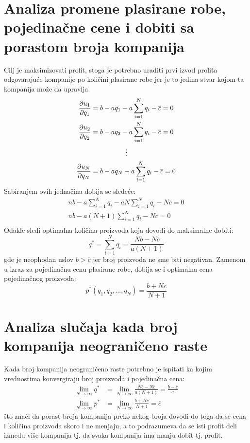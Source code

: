 \documentclass[12pt]{article}
\begin{document}
\section{Analiza promene plasirane robe, pojedinačne cene i dobiti sa porastom
broja kompanija}
\par Cilj je maksimizovati profit, stoga je potrebno uraditi prvi izvod profita
odgovarajuće kompanije po količini plasirane robe jer je to jedina stvar kojom
ta kompanija može da upravlja.
\begin{align*}
	\frac{\partial u_1}{\partial q_1} &= b - a q_1 - a \sum_{i=1}^N q_i
	- \overline{c} = 0\\ 
	\frac{\partial u_2}{\partial q_2} &= b - a q_2 - a \sum_{i=1}^N q_i
	- \overline{c} = 0\\ 
		&\hspace{1.8cm}\vdots \\
	\frac{\partial u_N}{\partial q_N} &= b - a q_N - a \sum_{i=1}^N q_i
	- \overline{c} = 0 \\ 
\end{align*}
Sabiranjem ovih jednačina dobija se sledeće:
\begin{gather*} 	
	n b - a \sum_{i=1}^N q_i - a N \sum_{i=1}^N q_i
	- N \overline{c} = 0 \\
	n b - a (N+1) \sum_{i=1}^N q_i - N \overline{c} = 0 \\
\end{gather*}
Odakle sledi optimalna količina proizvoda koja dovodi do maksimalne dobiti:
\begin{equation}
	q^* = \sum_{i=1}^N q_i = \frac{N b - N \overline{c}}{a (N+1)}
\end{equation}
gde je neophodan uslov $b > \overline{c}$ jer broj proizvoda ne sme biti
negativan.
Zamenom u izraz za pojedinačnu cenu plasirane robe, dobija se i optimalna cena
pojedinačnog proizvoda:
\begin{equation}
	p^* (q_1, q_2, ..., q_N) = \frac{b + N \overline{c}}{N+1}
\end{equation}
\section{Analiza slučaja kada broj kompanija neograničeno raste}
\par Kada broj kompanija neograničeno raste potrebno je ispitati ka kojim
vrednostima konvergiraju broj proizvoda i pojedinačna cena:
\begin{align*}
	\lim_{N \rightarrow \infty} q^*
	&= \lim_{N \rightarrow \infty} \frac{N b - N \overline{c}}{a (N+1)}
	= \frac{b - \overline{c}}{a} \\
	\lim_{N \rightarrow \infty} p^*
	&= \lim_{N \rightarrow \infty} \frac{b + N \overline{c}}{N+1}
	= \overline{c}
\end{align*}
što znači da porast broja kompanija preko nekog broja dovodi do toga da se
cena i količina proizvoda skoro i ne menjaju, a to podrazumeva da se isti
profit deli između više kompanija tj. da svaka kompanija ima manju dobit tj.
profit. 
\end{document}
